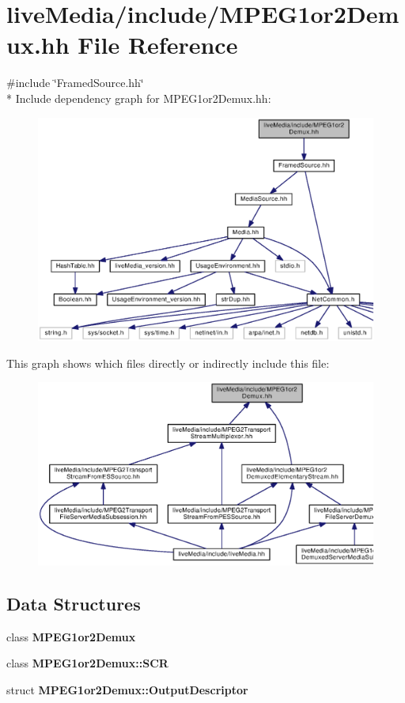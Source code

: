 \section{live\+Media/include/\+M\+P\+E\+G1or2\+Demux.hh File Reference}
\label{MPEG1or2Demux_8hh}
{\ttfamily \#include \char`\"{}Framed\+Source.\+hh\char`\"{}}\\*
Include dependency graph for M\+P\+E\+G1or2\+Demux.\+hh\+:
\nopagebreak
\begin{figure}[H]
\begin{center}
\leavevmode
\includegraphics[width=350pt]{MPEG1or2Demux_8hh__incl}
\end{center}
\end{figure}
This graph shows which files directly or indirectly include this file\+:
\nopagebreak
\begin{figure}[H]
\begin{center}
\leavevmode
\includegraphics[width=350pt]{MPEG1or2Demux_8hh__dep__incl}
\end{center}
\end{figure}
\subsection*{Data Structures}
\begin{DoxyCompactItemize}
\item 
class {\bf M\+P\+E\+G1or2\+Demux}
\item 
class {\bf M\+P\+E\+G1or2\+Demux\+::\+S\+C\+R}
\item 
struct {\bf M\+P\+E\+G1or2\+Demux\+::\+Output\+Descriptor}
\end{DoxyCompactItemize}
